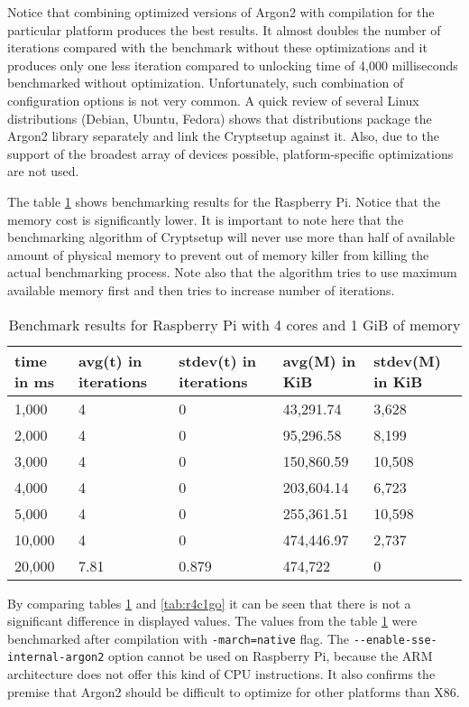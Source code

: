 \documentclass[nolof]{fithesis3}
\begin{document}
Notice that combining optimized versions of Argon2 with compilation for the particular platform produces the best results. It almost doubles the number of iterations compared with the benchmark without these optimizations and it produces only one less iteration compared to unlocking time of 4,000 milliseconds benchmarked without optimization. Unfortunately, such combination of configuration options is not very common. A quick review of several Linux distributions (Debian, Ubuntu, Fedora) shows that distributions package the Argon2 library separately and link the Cryptsetup against it. Also, due to the support of the broadest array of devices possible, platform-specific optimizations are not used.

The table \ref{tab:r4c1g} shows benchmarking results for the Raspberry Pi.  Notice that the memory cost is significantly lower. It is important to note here that the benchmarking algorithm of Cryptsetup will never use more than half of available amount of physical memory to prevent out of memory killer from killing the actual benchmarking process. Note also that the algorithm tries to use maximum available memory first and then tries to increase number of iterations.

\noindent
\begin{table}
\caption{Benchmark results for Raspberry Pi with 4 cores and 1 GiB of memory}
\label{tab:r4c1g}
\begin{tabularx}{\textwidth}{| X | X | X | X | X |}
\hline
time in ms & avg(t)  in iterations & stdev(t) in iterations & avg(M) in KiB & stdev(M) in KiB\\
\hline
1,000 & 4 & 0 & 43,291.74 & 3,628\\
\hline
2,000 & 4 & 0 & 95,296.58 & 8,199\\
\hline
3,000 & 4 & 0 & 150,860.59 & 10,508\\
\hline
4,000 & 4 & 0 & 203,604.14 & 6,723\\
\hline
5,000 & 4 & 0 & 255,361.51 & 10,598\\
\hline
10,000 & 4 & 0 & 474,446.97 & 2,737\\
\hline
20,000 & 7.81 & 0.879 & 474,722 & 0\\
\hline
\end{tabularx}
\end{table}

By comparing tables \ref{tab:r4c1g} and \ref{tab:r4c1go} it can be seen that there is not a significant difference in displayed values. The values from the table \ref{tab:r4c1g} were benchmarked after compilation with \verb+-march=native+ flag. The \verb+--enable-sse-internal-argon2+ option cannot be used on Raspberry Pi, because the ARM architecture does not offer this kind of CPU instructions. It also confirms the premise that Argon2 should be difficult to optimize for other platforms than X86.
\end{document}
